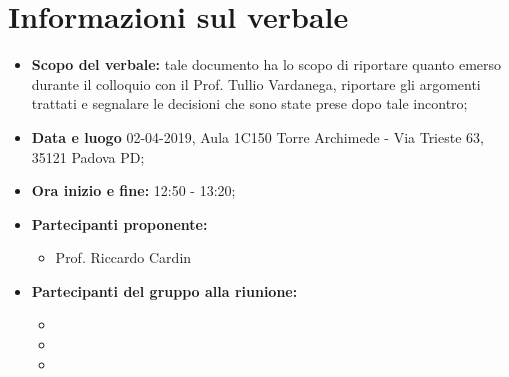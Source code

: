 \clearpage
\section{Informazioni sul verbale}
\begin{itemize}
	\item \textbf {Scopo del verbale:} tale documento ha lo scopo di riportare quanto emerso durante il colloquio con il Prof. Tullio Vardanega, riportare gli argomenti trattati e segnalare le decisioni che sono state prese dopo tale incontro;
	\item \textbf {Data e luogo} 02-04-2019, Aula 1C150 Torre Archimede - Via Trieste 63, 35121 Padova PD;
	\item \textbf {Ora inizio e fine:} 12:50 - 13:20;
	\item \textbf {Partecipanti proponente:} 
		\begin{itemize}
			\item Prof. Riccardo Cardin
		\end{itemize}
	\item \textbf {Partecipanti del gruppo alla riunione:} 
		 \begin{itemize}
			\item \sonia
			\item \alessandro
			\item \andrea
		\end{itemize}
\end{itemize}